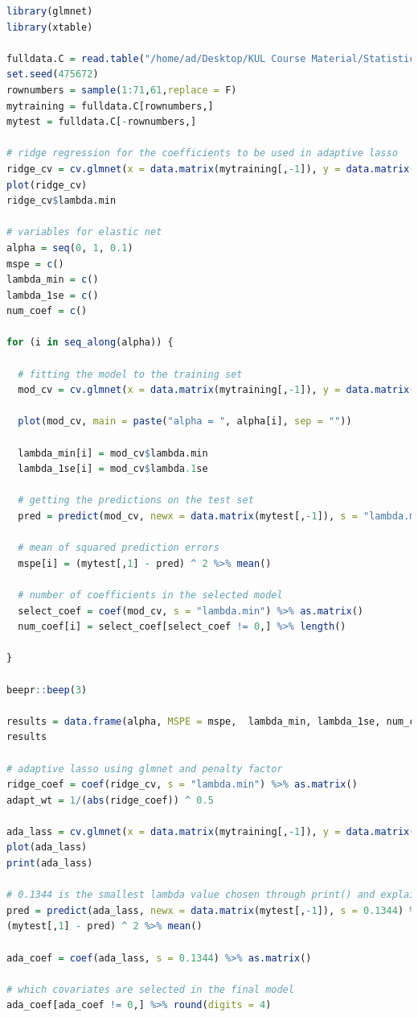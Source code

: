 \documentclass[paper=a4, fontsize=11pt]{scrartcl} %
\numberwithin{equation}{section} %
\begin{document}
\begin{lstlisting}[language = R, frame = single]
library(glmnet)
library(xtable)

fulldata.C = read.table("/home/ad/Desktop/KUL Course Material/Statistical Modelling/Assignment/Examdata2016-C.txt", header = T, sep = ",")
set.seed(475672)
rownumbers = sample(1:71,61,replace = F)
mytraining = fulldata.C[rownumbers,]
mytest = fulldata.C[-rownumbers,]

# ridge regression for the coefficients to be used in adaptive lasso
ridge_cv = cv.glmnet(x = data.matrix(mytraining[,-1]), y = data.matrix(mytraining[,1]), nfolds = 5, alpha = 0, type.measure = "mse")
plot(ridge_cv)
ridge_cv$lambda.min

# variables for elastic net
alpha = seq(0, 1, 0.1)
mspe = c()
lambda_min = c()
lambda_1se = c()
num_coef = c()

for (i in seq_along(alpha)) {
  
  # fitting the model to the training set
  mod_cv = cv.glmnet(x = data.matrix(mytraining[,-1]), y = data.matrix(mytraining[,1]), nfolds = 5, alpha = alpha[i], type.measure = "mse")
  
  plot(mod_cv, main = paste("alpha = ", alpha[i], sep = ""))
  
  lambda_min[i] = mod_cv$lambda.min
  lambda_1se[i] = mod_cv$lambda.1se
  
  # getting the predictions on the test set
  pred = predict(mod_cv, newx = data.matrix(mytest[,-1]), s = "lambda.min") %>% as.vector()
  
  # mean of squared prediction errors
  mspe[i] = (mytest[,1] - pred) ^ 2 %>% mean()
  
  # number of coefficients in the selected model
  select_coef = coef(mod_cv, s = "lambda.min") %>% as.matrix()
  num_coef[i] = select_coef[select_coef != 0,] %>% length()
  
}

beepr::beep(3)

results = data.frame(alpha, MSPE = mspe,  lambda_min, lambda_1se, num_coef)
results

# adaptive lasso using glmnet and penalty factor
ridge_coef = coef(ridge_cv, s = "lambda.min") %>% as.matrix()
adapt_wt = 1/(abs(ridge_coef)) ^ 0.5

ada_lass = cv.glmnet(x = data.matrix(mytraining[,-1]), y = data.matrix(mytraining[,1]), alpha = 1, penalty.factor = adapt_wt, nfolds = 5, type.measure = "mse")
plot(ada_lass)
print(ada_lass)

# 0.1344 is the smallest lambda value chosen through print() and explains 92% of the variability in the response
pred = predict(ada_lass, newx = data.matrix(mytest[,-1]), s = 0.1344) %>% as.vector()
(mytest[,1] - pred) ^ 2 %>% mean()

ada_coef = coef(ada_lass, s = 0.1344) %>% as.matrix()

# which covariates are selected in the final model
ada_coef[ada_coef != 0,] %>% round(digits = 4)
\end{lstlisting}
\end{document}
